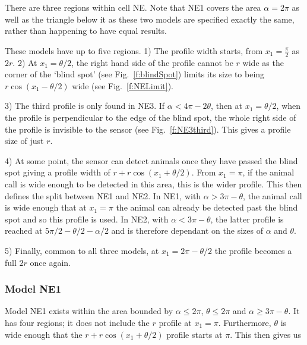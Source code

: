 There are three regions within cell NE. Note that NE1 covers the area $\alpha=2\pi$ as well as the triangle below it as these two models are specified exactly the same, rather than happening to have equal results.

These models have up to five regions. 1) The profile width starts, from $x_1=\frac{\pi}{2}$ as $2r$. 2) At $x_1 = \theta/2$, the right hand side of the profile cannot be $r$ wide as the corner of the `blind spot' (see Fig.~\ref{f:blindSpot}) limits its size to being $r\cos(x_1 - \theta/2)$ wide (see Fig.~\ref{f:NELimit}). 

3) The third profile is only found in NE3. If $\alpha < 4\pi - 2\theta$, then at $x_1=\theta/2$, when the profile is perpendicular to the edge of the blind spot, the whole right side of the profile is invisible to the sensor (see Fig.~\ref{f:NE3third}). This gives a profile size of just $r$.

4) At some point, the sensor can detect animals once they have passed the blind spot giving a profile width of $r + r\cos(x_1 + \theta/2)$. From $x_1=\pi$, if the animal call is wide enough to be detected in this area, this is the wider profile. This then defines the split between NE1 and NE2. In NE1, with $\alpha > 3\pi - \theta$, the animal call is wide enough that at $x_1=\pi$ the animal can already be detected past the blind spot and so this profile is used. In NE2, with $\alpha < 3\pi - \theta$, the latter profile is reached at $5\pi/2 - \theta/2 - \alpha/2$ and is therefore dependant on the sizes of $\alpha$ and $\theta$. 

5) Finally, common to all three models, at $x_1 = 2\pi - \theta/2$ the profile becomes a full $2r$ once again.


\subsubsection{Model NE1} \label{NE1}

Model NE1 exists within the area bounded by $\alpha\le2\pi$, $\theta\le2\pi$ and $\alpha \ge 3\pi - \theta$. It has four regions; it does not include the $r$ profile at $x_1=\pi$. Furthermore, $\theta$ is wide enough that the $r + r\cos(x_1 + \theta/2)$ profile starts at $\pi$. This then gives us





